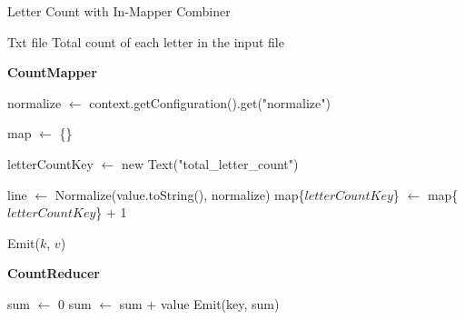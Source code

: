 \begin{algorithm}[H]
    \caption{Letter Count with In-Mapper Combiner}
    \begin{algorithmic}[1]
    \Require Txt file
    \Ensure Total count of each letter in the input file
    
    \vspace{1em}

    \Statex
    \noindent \textbf{CountMapper}
        

            \State normalize $\leftarrow$ context.getConfiguration().get("normalize")

            \State map $\leftarrow$ \{\}

            \State letterCountKey $\leftarrow$ new Text("total\_letter\_count")

        \EndProcedure
    
        \vspace{1em}

            \State line $\leftarrow$ Normalize(value.toString(), normalize)
                \State map\{{$letterCountKey$}\} $\leftarrow$ map\{{$letterCountKey$}\} + 1
            \EndFor
        \EndProcedure
    
        \vspace{1em}

                \State Emit($k$, $v$) 
            \EndFor
        \EndProcedure
    
        \vspace{1em}

    \Statex
    \noindent \textbf{CountReducer}

    
            \State sum $\leftarrow$ 0
                \State sum $\leftarrow$ sum + value
            \EndFor
            \State Emit(key, sum)
        \EndProcedure

    \end{algorithmic}
    \end{algorithm}
    
